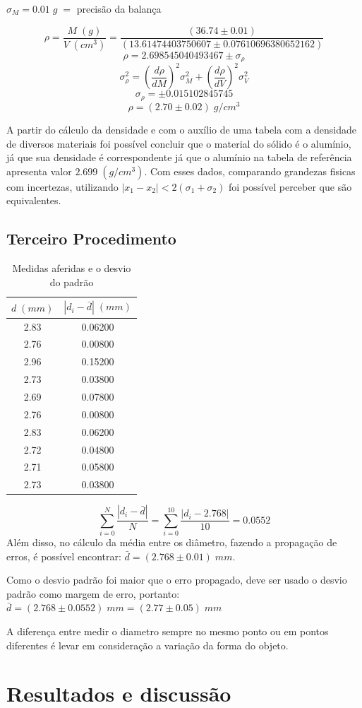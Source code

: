 \documentclass{article}
\begin{document}
$\sigma_M = 0.01\;g\; = $ precisão da balança

\[\rho = \frac{M\;(g)}{V\;(cm^3)} = \frac{(36.74\pm0.01)}{(13.61474403750607\pm0.07610696380652162)}\]
\[\rho = 2.698545040493467 \pm \sigma_\rho\]
\[\sigma_\rho^2 = \left(\frac{d\rho}{dM}\right)^2\sigma_M^2+\left(\frac{d\rho}{dV}\right)^2\sigma_V^2\]
\[\sigma_\rho =\pm 0.015102845745\]
\[\rho = (2.70 \pm 0.02)\;g/cm^3\]

A partir do cálculo da densidade e com o auxílio de uma tabela com a densidade de diversos materiais foi possível concluir que o material do sólido é o alumínio, já que sua densidade é correspondente já que o alumínio na tabela de referência apresenta valor $2.699\;(g/cm^3)$. Com esses dados, comparando grandezas fisicas com incertezas, utilizando $|x_1-x_2|<2(\sigma_1+\sigma_2)$ foi possível perceber que são equivalentes.

\subsection{Terceiro Procedimento}

\begin{table}[!ht]
    \centering
    \begin{tabular}{c|c}
        $d\;(mm)$ & $|d_i-\bar{d}|\;(mm)$ \\\hline
        2.83 & 0.06200\\
        2.76 & 0.00800\\
        2.96 & 0.15200\\
        2.73 & 0.03800\\
        2.69 & 0.07800\\
        2.76 & 0.00800\\
        2.83 & 0.06200\\
        2.72 & 0.04800\\
        2.71 & 0.05800\\
        2.73 & 0.03800\\
    \end{tabular}
    \caption{Medidas aferidas e o desvio do padrão}
    \label{tab:my_label}
\end{table}
\[\sum_{i=0}^N \frac{|d_i-\bar{d}|}{N}=\sum_{i=0}^{10} \frac{|d_i-2.768|}{10}=0.0552\]
\indent
Além disso, no cálculo da média entre os diâmetro, fazendo a propagação de erros, é possível encontrar: $\bar{d} = (2.768 \pm 0.01)\;mm$.

Como o desvio padrão foi maior que o erro propagado, deve ser usado o desvio padrão como margem de erro, portanto: $\bar{d} = (2.768 \pm 0.0552)\;mm = (2.77 \pm 0.05)\;mm$

A diferença entre medir o diametro sempre no mesmo ponto ou em pontos diferentes é levar em consideração a variação da forma do objeto.

\section{Resultados e discussão}
\end{document}
